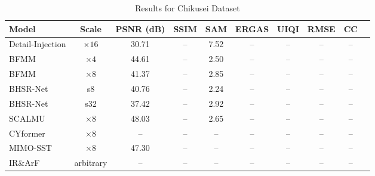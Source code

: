 \documentclass[conference]{IEEEtran}
\begin{document}
\begin{table}[htbp]
\caption{Results for Chikusei Dataset \cite{chikusei_dataset}}
\begin{center}
\begin{adjustbox}{width=\textwidth}
\begin{tabular}{lccccccccc}
\toprule
\textbf{Model} & \textbf{Scale} & \textbf{PSNR (dB)} & \textbf{SSIM} & \textbf{SAM} & \textbf{ERGAS} & \textbf{UIQI} & \textbf{RMSE} & \textbf{CC} \\
\midrule
Detail-Injection \cite{fang2026detail} & $\times 16$ & 30.71 & -- & 7.52 & -- & -- & -- & -- \\
BFMM \cite{li2026bfmm} & $\times 4$ & 44.61 & -- & 2.50 & -- & -- & -- & -- \\
BFMM \cite{li2026bfmm} & $\times 8$ & 41.37 & -- & 2.85 & -- & -- & -- & -- \\
BHSR-Net \cite{dou2026bhsrnet} & s8 & 40.76 & -- & 2.24 & -- & -- & -- & -- \\
BHSR-Net \cite{dou2026bhsrnet} & s32 & 37.42 & -- & 2.92 & -- & -- & -- & -- \\
SCALMU \cite{xu2026scalmu} & $\times 8$ & 48.03 & -- & 2.65 & -- & -- & -- & -- \\
CYformer \cite{chen2025cyformer} & $\times 8$ & -- & -- & -- & -- & -- & -- & -- \\
MIMO-SST \cite{fang2024mimosst} & $\times 8$ & 47.30 & -- & -- & -- & -- & -- & -- \\
IR\&ArF \cite{qu2025irarf} & arbitrary & -- & -- & -- & -- & -- & -- & -- \\
\bottomrule
\end{tabular}
\end{adjustbox}
\label{tab:chikusei}
\end{center}
\end{table}
\end{document}

